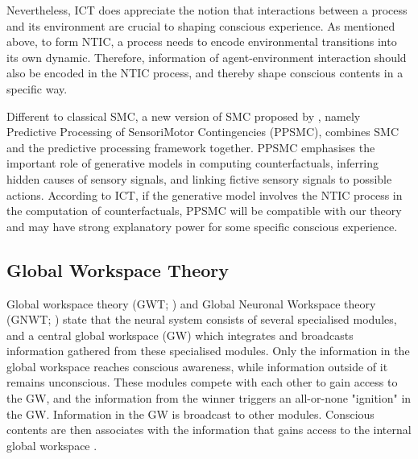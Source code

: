 \documentclass[utf8]{article}
\begin{document}
    		Nevertheless, ICT does appreciate the notion that interactions between a process and its environment are crucial to shaping conscious experience. As mentioned above, to form NTIC, a process needs to encode environmental transitions into its own dynamic. Therefore, information of agent-environment interaction should also be encoded in the NTIC process, and thereby shape conscious contents in a specific way.
    	    
    	    Different to classical SMC, a new version of SMC proposed by \cite{seth2014predictive, seth2015presence}, namely Predictive Processing of SensoriMotor Contingencies (PPSMC), combines SMC and the predictive processing framework together. PPSMC emphasises the important role of generative models in computing counterfactuals, inferring hidden causes of sensory signals, and linking fictive sensory signals to possible actions. According to ICT, if the generative model involves the NTIC process in the computation of counterfactuals, PPSMC will be compatible with our theory and may have strong explanatory power for some specific conscious experience.    	        	 
    	    
				
        
		\subsection{Global Workspace Theory}
		Global workspace theory (GWT; \cite{baars1988cognitive, baars1997theatre, baars2002conscious}) and Global Neuronal Workspace theory (GNWT; \cite{dehaene1998neuronal, dehaene2001towards, dehaene2011experimental}) state that the neural system consists of several specialised modules, and a central global workspace (GW) which integrates and broadcasts information gathered from these specialised modules. Only the information in the global workspace reaches conscious awareness, while information outside of it remains unconscious. These modules compete with each other to gain access to the GW, and the information from the winner triggers an all-or-none "ignition" in the GW. Information in the GW is broadcast to other modules. Conscious contents are then associates with the information that gains access to the internal global workspace \citep{Dehaene2017}.
		
\end{document}
